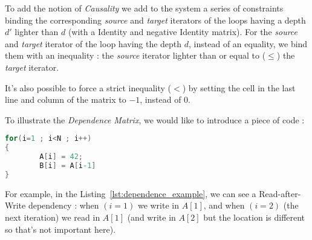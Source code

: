 \documentclass[paper=a4, fontsize=11.5pt]{scrartcl}
\numberwithin{equation}{section}        %
\numberwithin{figure}{section}          %
\numberwithin{table}{section}               %
\begin{document}
\begin{itemize}
                To add the notion of \textit{Causality} we add to the system a series of
                constraints binding the corresponding \textit{source} and \textit{target}
                iterators of the loops having a depth $d'$ lighter than $d$
                (with a Identity and negative Identity matrix).
                For the \textit{source} and \textit{target} iterator of the loop having
                the depth $d$, instead of an equality, we bind them with an inequality :
                the \textit{source} iterator lighter than or equal to ($\leq$) the \textit{target} iterator.

                It's also possible to force a strict inequality ($<$) by setting the cell
                in the last line and column of the matrix to $-1$, instead of $0$.
        \end{itemize}

        \bigskip

        To illustrate the \textit{Dependence Matrix}, we would like to introduce a piece of code :
        \pagebreak
\begin{lstlisting}[frame=single, language=C, caption={Simple Code for Dependence Relation Example}, label={lst:dependence_example}]
for(i=1 ; i<N ; i++)
{
        A[i] = 42;
        B[i] = A[i-1]
}
\end{lstlisting}
        
        For example, in the Listing~\ref{lst:dependence_example}, we can see a Read-after-Write
        dependency : when $(i=1)$ we write in $A[1]$, and when $(i=2)$ (the next iteration)
        we read in $A[1]$ (and write in $A[2]$ but the location is different so that's not important here).
\end{document}
